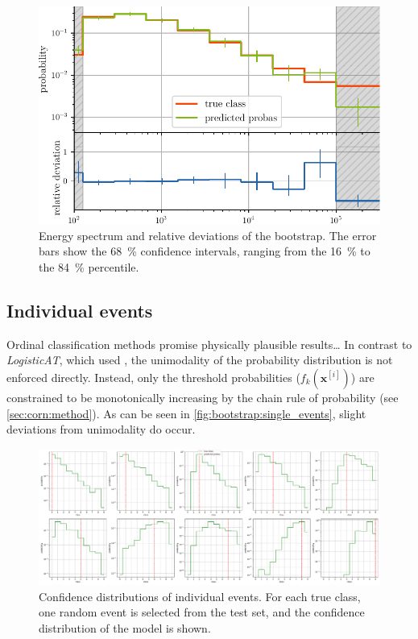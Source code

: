 \begin{figure}
  \centering
  \includegraphics[scale=1]{content/plots/bootstrap:spectrum_full.pdf}
  \caption{
    Energy spectrum and relative deviations of the bootstrap.
    The error bars show the \SI{68}{\percent} confidence intervals,
    ranging from the \SI{16}{\percent} to the \SI{84}{\percent} percentile.
  }
  \label{fig:bootstrap:spectrum}
\end{figure}


\subsection{Individual events}
Ordinal classification methods promise physically plausible results… %
In contrast to \emph{LogisticAT},
    which \citeauthor{dsea_jan} used \cite{dsea_jan},
  the unimodality of the probability distribution is not enforced directly.
Instead,
  only the threshold probabilities ($f_k(\mathbf{x}^{[i]})$) are constrained to be monotonically increasing
  by the chain rule of probability
  (see \autoref{sec:corn:method}).
As can be seen in \autoref{fig:bootstrap:single_events},
  slight deviations from unimodality do occur.


\begin{figure}
  \centering
  \includegraphics[width=\textwidth]{content/plots/halftime/single_events.pdf}
  \caption{
    Confidence distributions of individual events.
    For each true class,
    one random event is selected from the test set,
    and the confidence distribution of the model is shown.
  }
  \label{fig:bootstrap:single_events}
\end{figure}
